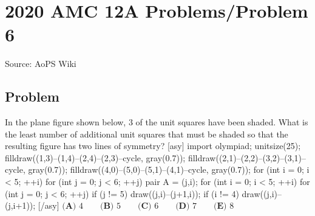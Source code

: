 \documentclass[12pt]{article}
\begin{document}
\section*{{2020 AMC 12A Problems/Problem 6}}
Source: AoPS Wiki

\subsection*{Problem}
In the plane figure shown below, $3$ of the unit squares have been shaded. What is the least number of additional unit squares that must be shaded so that the resulting figure has two lines of symmetry? [asy] import olympiad; unitsize(25); filldraw((1,3)--(1,4)--(2,4)--(2,3)--cycle, gray(0.7)); filldraw((2,1)--(2,2)--(3,2)--(3,1)--cycle, gray(0.7)); filldraw((4,0)--(5,0)--(5,1)--(4,1)--cycle, gray(0.7)); for (int i = 0; i < 5; ++i) { for (int j = 0; j < 6; ++j) { pair A = (j,i); } } for (int i = 0; i < 5; ++i) { for (int j = 0; j < 6; ++j) { if (j != 5) { draw((j,i)--(j+1,i)); } if (i != 4) { draw((j,i)--(j,i+1)); } } } [/asy] $\textbf{(A) } 4 \qquad \textbf{(B) } 5 \qquad \textbf{(C) } 6 \qquad \textbf{(D) } 7 \qquad \textbf{(E) } 8$
\end{document}
